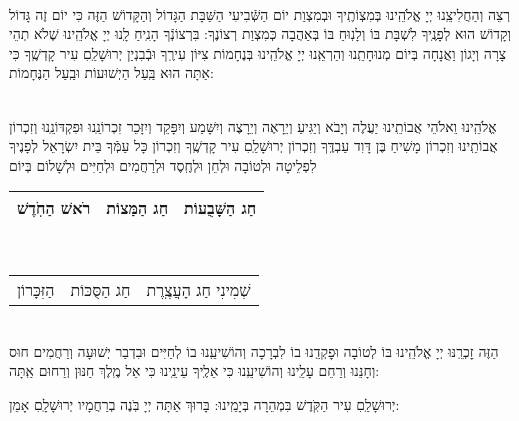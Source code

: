 \documentclass[twoside, openany, parskip=half, 11pt]{book}
\begin{document}
\vspace{-.25\baselineskip}
\begin{sometimes}

\shabbos\\
רְצֵה וְהַחֲלִיצֵֽנוּ יְיָ אֱלֹהֵֽינוּ בְּמִצְוֹתֶֽיךָ וּבְמִצְוַת יוֹם הַשְּֿׁבִיעִי הַשַּׁבָּת הַגָּדוֹל וְהַקָּדוֹשׁ הַזֶּה כִּי יוֹם זֶה גָּדוֹל וְקָדוֹשׁ הוּא לְפָנֶֽיךָ לִשְׁבָּת בּוֹ וְלָנֽוּחַ בּוֹ בְּאַהֲבָה כְּמִצְוַת רְצוֹנֶךָ: בִּרְצוֹנְֿךָ הָנִֽיחַ לָֽנוּ יְיָ אֱלֹהֵֽינוּ שֶׁלֹא תְהֵי צָרָה וְיָגוֹן וַאֲנָחָה בְּיוֹם מְנוּחָתֵֽנוּ וְהַרְאֵֽנוּ יְיָ אֱלֹהֵֽינוּ בְּנֶחָמוֹת צִיּוֹן עִירֶֽךָ וּבְֿבִנְיַן יְרוּשָׁלַֽםִ עִיר קָדְשֶֽׁךָ כִּי אַתָּה הוּא בַּֽעַל הַיְשׁוּעוֹת וּבַֽעַל הַנֶּחָמוֹת: 


\sepline %

\vspace{-.25\baselineskip}
\\
אֱלֹהֵֽינוּ וֵאלֹהֵי אֲבוֹתֵֽינוּ יַעֲלֶה וְיָבֹא וְיַגִּיעַ וְיֵרָאֶה וְיֵרָצֶה וְיִשָּׁמַע וְיִפָּקֵד וְיִזָּכֵר זִכְרוֹנֵֽנוּ וּפִקְדּוֹנֵֽנוּ וְזִכְרוֹן אֲבוֹתֵֽינוּ וְזִכְרוֹן מָשִׁיחַ בֶּן דָּוִד עַבְדֶּֽךָ וְזִכְרוֹן יְרוּשָׁלַֽםִ עִיר קָדְשֶֽׁךָ וְזִכְרוֹן כָּל עַמְּֿךָ בֵּית יִשְׂרָאֵל לְפָנֶיךָ לִפְלֵיטָה וּלְטוֹבָה וּלְחֵן וּלְחֶֽסֶד וּלְרַחֲמִים וּלְחַיִּים וּלְשָׁלוֹם בְּיוֹם\\ 
\begin{tabular}{c|c|c}
 רֹאשׁ הַחֹֽדֶשׁ & חַג הַמַּצוֹת & חַג הַשָּׁבֻעוֹת\\ \hline
 \end{tabular}\\
\begin{tabular}{c|c|c}
 הַזִּכָּרוֹן & חַג הַסֻּכּוֹת & שְׁמִינִי חַג הָעֲצֶֽרֶת
\end{tabular}\\
הַזֶּה זׇכְרֵֽנּוּ יְיָ אֱלֹהֵֽינוּ בּוֹ לְטוֹבָה וּפׇקְדֵֽנוּ בוֹ לִבְרָכָה וְהוֹשִׁיעֵֽנוּ בוֹ לְחַיִּים וּבִדְבַר יְשׁוּעָה וְרַחֲמִים חוּס וְחָנֵּנוּ וְרַחֵם עָלֵֽינוּ וְהוֹשִׁיעֵֽנוּ כִּי אֵלֶֽיךָ עֵינֵֽינוּ כִּי אֵל מֶֽלֶךְ חַנּוּן וְרַחוּם אַֽתָּה:

\end{sometimes}

 יְרוּשָׁלַֽםִ עִיר הַקֹּֽדֶשׁ בִּמְהֵרָה בְּיָמֵֽינוּ: בָּרוּךְ אַתָּה יְיָ בֹּֽנֶה בְרַחֲמָיו יְרוּשָׁלָֽםִ אָמֵן:
\end{document}
